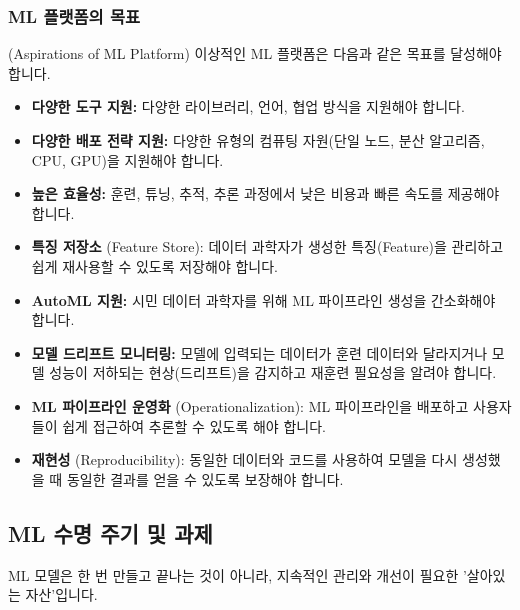 \documentclass[11pt,a4paper]{article}
\theoremstyle{definition}
\begin{document}
\subsubsection*{ML 플랫폼의 목표} (Aspirations of ML Platform)
이상적인 ML 플랫폼은 다음과 같은 목표를 달성해야 합니다.
\begin{itemize}
    \item \textbf{다양한 도구 지원:} 다양한 라이브러리, 언어, 협업 방식을 지원해야 합니다.
    \item \textbf{다양한 배포 전략 지원:} 다양한 유형의 컴퓨팅 자원(단일 노드, 분산 알고리즘, CPU, GPU)을 지원해야 합니다.
    \item \textbf{높은 효율성:} 훈련, 튜닝, 추적, 추론 과정에서 낮은 비용과 빠른 속도를 제공해야 합니다.
    \item \textbf{특징 저장소} (Feature Store): 데이터 과학자가 생성한 특징(Feature)을 관리하고 쉽게 재사용할 수 있도록 저장해야 합니다.
    \item \textbf{AutoML 지원:} 시민 데이터 과학자를 위해 ML 파이프라인 생성을 간소화해야 합니다.
    \item \textbf{모델 드리프트 모니터링:} 모델에 입력되는 데이터가 훈련 데이터와 달라지거나 모델 성능이 저하되는 현상(드리프트)을 감지하고 재훈련 필요성을 알려야 합니다.
    \item \textbf{ML 파이프라인 운영화} (Operationalization): ML 파이프라인을 배포하고 사용자들이 쉽게 접근하여 추론할 수 있도록 해야 합니다.
    \item \textbf{재현성} (Reproducibility): 동일한 데이터와 코드를 사용하여 모델을 다시 생성했을 때 동일한 결과를 얻을 수 있도록 보장해야 합니다.
\end{itemize}

\subsection*{ML 수명 주기 및 과제}
ML 모델은 한 번 만들고 끝나는 것이 아니라, 지속적인 관리와 개선이 필요한 '살아있는 자산'입니다.
\end{document}
